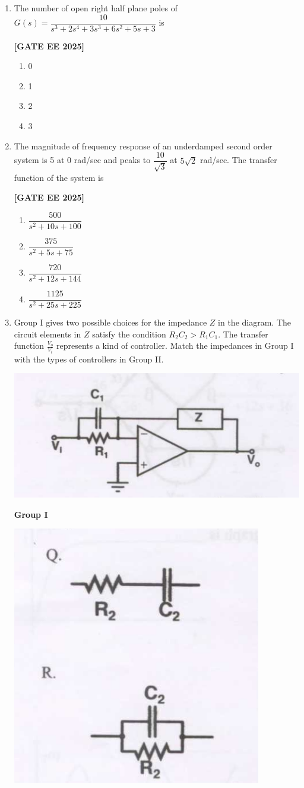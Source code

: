 \documentclass[12pt]{article}
\begin{document}
\begin{enumerate}[leftmargin=*, label=\textbf{Q.\arabic*:}]
\item The number of open right half plane poles of $G(s) = \dfrac{10}{s^3 + 2s^4 + 3s^3 + 6s^2 + 5s + 3}$ is
 
\noindent \textbf{[GATE EE 2025]}
\begin{enumerate}
  \item 0
  \item 1
  \item 2
  \item 3
\end{enumerate}

\item The magnitude of frequency response of an underdamped second order system is 5 at 0 rad/sec and peaks to $\dfrac{10}{\sqrt{3}}$ at $5 \sqrt{2}$ rad/sec. The transfer function of the system is
 
\noindent \textbf{[GATE EE 2025]}
\begin{enumerate}
  \item $\dfrac{500}{s^2 + 10s + 100}$
  \item $\dfrac{375}{s^2 + 5s + 75}$
  \item $\dfrac{720}{s^2 + 12s + 144}$
  \item $\dfrac{1125}{s^2 + 25s + 225}$
\end{enumerate}

\item
Group I gives two possible choices for the impedance $Z$ in the diagram. The circuit elements in $Z$ satisfy the condition $R_2C_2 > R_1C_1$. The transfer function $\frac{V_o}{V_i}$ represents a kind of controller. Match the impedances in Group I with the types of controllers in Group II.
\begin{center}
\includegraphics[width=0.8\columnwidth]{figs/q43a.png}
\end{center}
\textbf{Group I}

\includegraphics[width=0.5\columnwidth]{figs/q43b.png}


\end{enumerate}
\end{document}
